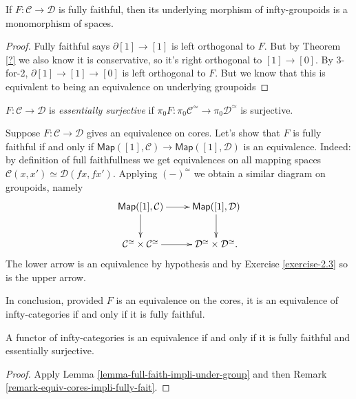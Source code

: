 \begin{lemma}
\label{lemma-full-faith-impli-under-group}
If $F: \mathcal{C} \to \mathcal{D}$ is fully
faithful,
then its underlying morphism of
infty-groupoids is a monomorphism
of spaces.
\end{lemma}

\begin{proof}
Fully faithful says $\partial[1] \to [1]$ is
left orthogonal to $F$. But by Theorem
\ref{?}
we also know it is conservative, so it's
right orthogonal
to $[1] \to [0]$. By 3-for-2, $\partial[1]
\to [1] \to [0]$
is left orthogonal to $F$. But we know that
this is equivalent
to being an equivalence on underlying
groupoids
\end{proof}

\begin{definition}
\label{definition-essentially-surjective}
$F:\mathcal{C} \to \mathcal{D}$ is {\it
essentially surjective} if
$\pi_0F: \pi_0\mathcal{C}^\simeq \to
\pi_0\mathcal{D}^\simeq$ is surjective.
\end{definition}

\begin{remark}
\label{remark-equiv-cores-impli-fully-fait}
Suppose $F:\mathcal{C} \to \mathcal{D}$ gives
an equivalence
on cores. Let's show that $F$ is fully
faithful
if and only if $\mathsf{Map}([1],\mathcal{C})
\to \mathsf{Map}([1],\mathcal{D})$
is an equivalence. Indeed: by definition of
full faithfullness
we get equivalences on all mapping spaces
$\mathcal{C}(x,x') \simeq
\mathcal{D}(fx,fx')$.
Applying $(-)^\simeq$ we obtain a similar
diagram on groupoids,
namely
$$
\xymatrix{
\mathsf{Map}([1],\mathcal{C})\ar[r]\ar[d]&
\mathsf{Map}([1],\mathcal{D})\ar[d]\\
\mathcal{C}^\simeq \times
\mathcal{C}^\simeq\ar[r]&
\mathcal{D}^\simeq\times \mathcal{D}^\simeq.
}
$$
The lower arrow is an equivalence by
hypothesis
and by Exercise \ref{exercise-2.3} so is the
upper arrow.

In conclusion, provided $F$ is an equivalence
on the cores,
it is an equivalence of infty-categories
if and only if it
is fully faithful.
\end{remark}

\begin{lemma}
\label{lemma-equiv-iff-fully-faith-essen}
A functor of infty-categories is an
equivalence
if and only if it is fully faithful and
essentially surjective.
\end{lemma}

\begin{proof}
Apply Lemma
\ref{lemma-full-faith-impli-under-group}
and then Remark
\ref{remark-equiv-cores-impli-fully-fait}.
\end{proof}

